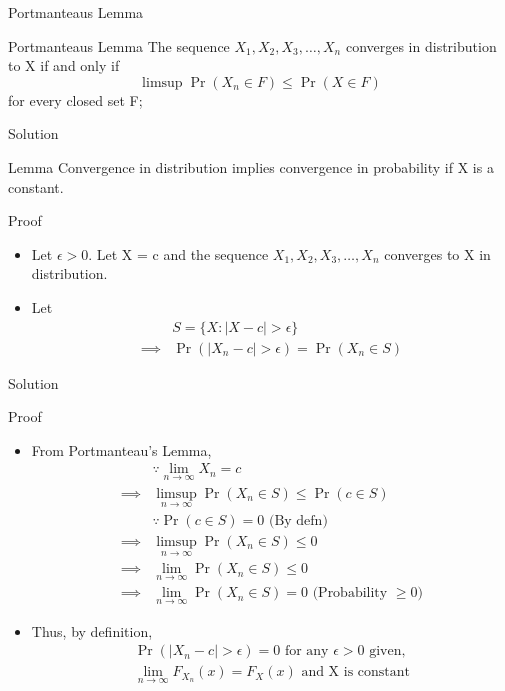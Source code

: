 \documentclass{beamer}
\providecommand{\pr}[1]{\ensuremath{\Pr\left(#1\right)}}
\begin{document}
\begin{frame}{Portmanteaus Lemma}
\begin{block}{Portmanteaus Lemma}
    The sequence $X_1,X_2,X_3, \dots ,X_n$ converges in distribution to X if and only if
    \begin{equation}
    \limsup \pr{X_{n}\in F} \leq \pr{X \in F}
    \end{equation} for every closed set F;
\end{block}
\end{frame}

\begin{frame}{Solution}
\begin{block}{Lemma}
     Convergence in distribution implies convergence in probability if X is a constant.
\end{block}
\begin{block}{Proof}
    \begin{itemize}
        \item Let $\epsilon > 0$. Let X = c and the sequence $X_1,X_2,X_3, \dots ,X_n$ converges to X in distribution.
        \item Let \begin{align}
            &S = \{X : |X - c| > \epsilon\} \\
            \implies &\pr{|X_n - c|>\epsilon} = \pr{X_ n\in S}
        \end{align}
        \end{itemize}
\end{block}
\end{frame}

\begin{frame}{Solution}
\begin{block}{Proof}
    \begin{itemize}
        \item From Portmanteau's Lemma, 
        \begin{align}
           &\because \lim_{n \rightarrow \infty}X_n = c \\
            \implies &\limsup_{n \rightarrow \infty} \pr{X_n \in S} \leq  \pr{c \in S} \\
            &\because \pr{c \in S} = 0 \text{ (By defn)} \\
            \implies &\limsup_{n \rightarrow \infty} \pr{X_n \in S} \leq 0 \\
            \implies &\lim_{n \rightarrow \infty} \pr{X_n \in S} \leq 0\\
            \implies &\lim_{n \rightarrow \infty} \pr{X_n \in S} = 0 \text{ (Probability $\geq 0$)}
        \end{align}
        \item Thus, by definition,
        \begin{multline}
             \pr{|X_n-c|> \epsilon} = 0 \text{ for any }\epsilon > 0 \text{ given,} \\    
            \lim_{n \rightarrow \infty} F_{X_n}(x) = F_X(x)\text{ and X is constant}
        \end{multline}
    \end{itemize}
\end{block}
\end{frame}
\end{document}

